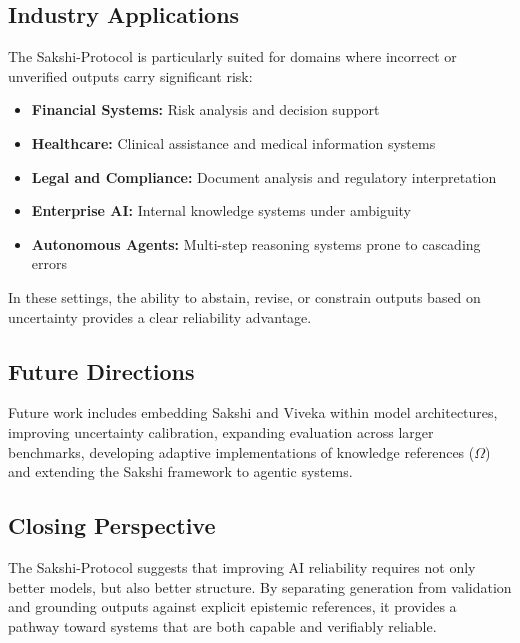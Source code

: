 \documentclass[12pt,a4paper]{article}
\begin{document}
\subsection{Industry Applications}

The Sakshi-Protocol is particularly suited for domains where incorrect or unverified outputs carry significant risk:

\begin{itemize}
\item \textbf{Financial Systems:} 
Risk analysis and decision support
\item \textbf{Healthcare:} 
Clinical assistance and medical information systems
\item \textbf{Legal and Compliance:} 
Document analysis and regulatory interpretation
\item \textbf{Enterprise AI:} 
Internal knowledge systems under ambiguity
\item \textbf{Autonomous Agents:} 
Multi-step reasoning systems prone to cascading errors
\end{itemize}

In these settings, the ability to abstain, revise, or constrain outputs based on uncertainty provides a clear reliability advantage.

\subsection{Future Directions}

Future work includes embedding Sakshi and Viveka within model architectures, improving uncertainty calibration, expanding evaluation across larger benchmarks, developing adaptive implementations of knowledge references ($\Omega$) and extending the Sakshi framework to agentic systems.

\subsection{Closing Perspective}

The Sakshi-Protocol suggests that improving AI reliability requires not only better models, but also better structure. By separating generation from validation and grounding outputs against explicit epistemic references, it provides a pathway toward systems that are both capable and verifiably reliable.
\end{document}
